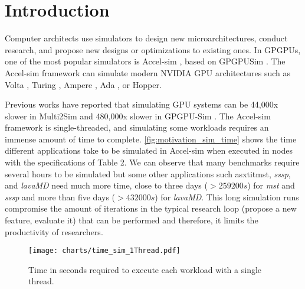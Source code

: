 \section{Introduction}

\par
Computer architects use simulators to design new microarchitectures, conduct research, and propose new designs or optimizations to existing ones. In GPGPUs, one of the most popular simulators is Accel-sim \cite{accelsim}, based on GPGPUSim \cite{gpgpusimOriginal}. The Accel-sim framework can simulate modern NVIDIA GPU architectures such as Volta \cite{voltaPaper}, Turing \cite{turingPaper}, Ampere \cite{amperePaper}, Ada \cite{adaPaper}, or Hopper\cite{hopperPaper}.

\par
Previous works have reported that simulating GPU systems can be 44,000x slower in Multi2Sim \cite{multi2sim} and 480,000x slower in GPGPU-Sim \cite{gputejas}. The Accel-sim framework is single-threaded, and simulating some workloads requires an immense amount of time to complete. \autoref{fig:motivation_sim_time} shows the time different applications take to be simulated in Accel-sim when executed in nodes with the specifications of Table 2. We can observe that many benchmarks require several hours to be simulated but some other applications such asxtit{mst}, \textit{sssp}, and \textit{lavaMD} need much more time, close to three days ($>259200s$) for \textit{mst} and \textit{sssp} and more than five days ($>432000s$) for \textit{lavaMD}. This long simulation runs compromise the amount of iterations in the typical research loop (propose a new feature, evaluate it) that can be performed and therefore, it limits the productivity of researchers.

\begin{figure}[ht]
  \centering
  \texttt{[image: charts/time\_sim\_1Thread.pdf]}
  \caption{Time in seconds required to execute each workload with a single thread.}
  \label{fig:motivation_sim_time}
\end{figure}

